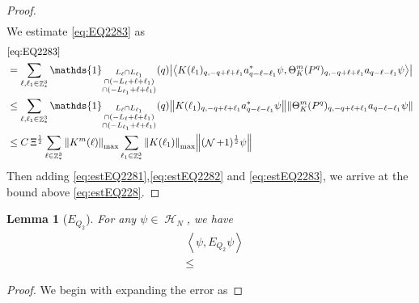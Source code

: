 \documentclass[sn-mathphys, Numbered ,a4paper]{sn-jnl}%
\DeclareMathOperator{\Z}{\mathbb{Z}}
\DeclareMathOperator{\HH}{\mathcal{H}}
\DeclareMathOperator{\NN}{\mathcal{N}}
\newcommand{\half}{\frac{1}{2}}
\newcommand{\eva}[1]{\left\langle #1 \right\rangle}
\theoremstyle{plain}
\newtheorem{lemma}[theorem]{Lemma}
\theoremstyle{definition}
\theoremstyle{remark}
\theoremstyle{plain}
\theoremstyle{definition}
\theoremstyle{remark}
\begin{document}
\begin{proof}
\begin{align}
\end{align}
We estimate \eqref{eq:EQ2283} as
\begin{align}
	& \eqref{eq:EQ2283}\nonumber\\
	&= \sum\limits_{\ell, \ell_1\in \Z^3_*} \mathds{1}_{\substack{L_{\ell}\cap L_{\ell_1}\\\cap (-L_{\ell}+\ell+\ell_1) \\ \cap (-L_{\ell_1}+\ell+\ell_1)}} (q) \abs{\eva{K(\ell_1)_{q,-q+\ell+\ell_1} a^*_{q-\ell-\ell_1} \psi, \Theta^m_{K}(P^q)_{q,-q+\ell+\ell_1} a_{q-\ell-\ell_1}\psi }}\nonumber\\
	&\leq \sum\limits_{\ell, \ell_1\in \Z^3_*} \mathds{1}_{\substack{L_{\ell}\cap L_{\ell_1}\\\cap (-L_{\ell}+\ell+\ell_1) \\ \cap (-L_{\ell_1}+\ell+\ell_1)}} (q) \norm{K(\ell_1)_{q,-q+\ell+\ell_1} a^*_{q-\ell-\ell_1} \psi}\norm{ \Theta^m_{K}(P^q)_{q,-q+\ell+\ell_1} a_{q-\ell-\ell_1}\psi }\nonumber\\
	&\leq C\,\Xi^\half \sum\limits_{\ell \in \Z^3_*} \norm{K^m(\ell)}_{\mathrm{max}} \sum\limits_{\ell_1 \in \Z^3_*} \norm{K(\ell_1)}_{\mathrm{max}}   \norm{  (\NN+1)^\half \psi}\label{eq:estEQ2283}
\end{align} 
Then adding \eqref{eq:estEQ2281},\eqref{eq:estEQ2282} and \eqref{eq:estEQ2283}, we arrive at the bound above \eqref{eq:estEQ228}.  
\end{proof}

\begin{lemma}[$E_{Q_2}$]
    For any $\psi \in \HH_N$, we have
    \begin{align}
     &\eva{\psi,E_{Q_2}\psi }\nonumber\\ 
     &\leq 
    \end{align}
\end{lemma}
\begin{proof}
    We begin with expanding the error as
    
\end{proof}
\end{document}
